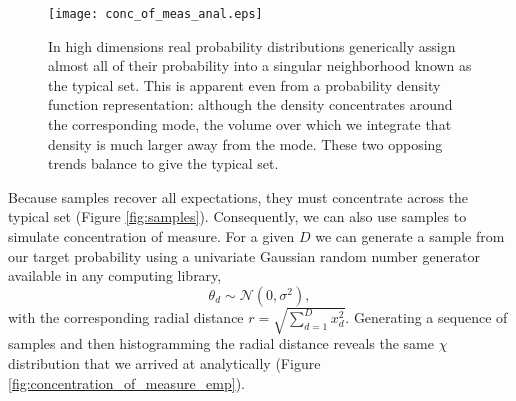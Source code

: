 \begin{figure*}
\centering
\texttt{[image: conc\_of\_meas\_anal.eps]}
\caption{In high dimensions real probability distributions generically 
assign almost all of their probability into a singular neighborhood known as
the typical set.  This is apparent even from a probability density function 
representation: although the density concentrates around the corresponding
mode, the volume over which we integrate that density is much larger away
from the mode.  These two opposing trends balance to give the typical set.}
\label{fig:conc_of_meas_anal}
\end{figure*}

Because samples recover all expectations, they must concentrate across 
the typical set (Figure \ref{fig:samples}).  Consequently, we can also use 
samples to simulate concentration of measure.  For a given $D$ we can 
generate a sample from our target probability using a univariate Gaussian 
random number generator available in any computing library,
%
\begin{equation*}
\theta_{d} \sim \mathcal{N} \! \left(0, \sigma^{2} \right),
\end{equation*}
%
with the corresponding radial distance $r = \sqrt{ \sum_{d = 1}^{D} x_{d}^{2} }$.
Generating a sequence of samples and then histogramming the radial 
distance reveals the same $\chi$ distribution that we arrived at analytically
(Figure \ref{fig:concentration_of_measure_emp}).

